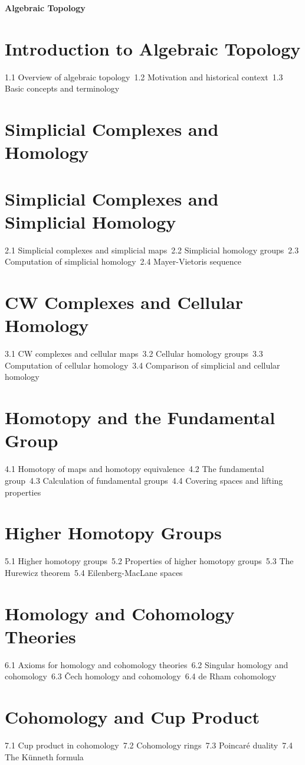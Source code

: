 {\LARGE \bf{Algebraic Topology}}
\section{Introduction to Algebraic Topology}
1.1 Overview of algebraic topology\
1.2 Motivation and historical context\
1.3 Basic concepts and terminology\
\section{Simplicial Complexes and Homology}
\section{Simplicial Complexes and Simplicial Homology}
2.1 Simplicial complexes and simplicial maps\
2.2 Simplicial homology groups\
2.3 Computation of simplicial homology\
2.4 Mayer-Vietoris sequence\
\section{CW Complexes and Cellular Homology}
3.1 CW complexes and cellular maps\
3.2 Cellular homology groups\
3.3 Computation of cellular homology\
3.4 Comparison of simplicial and cellular homology\
\section{Homotopy and the Fundamental Group}
4.1 Homotopy of maps and homotopy equivalence\
4.2 The fundamental group\
4.3 Calculation of fundamental groups\
4.4 Covering spaces and lifting properties\
\section{Higher Homotopy Groups}
5.1 Higher homotopy groups\
5.2 Properties of higher homotopy groups\
5.3 The Hurewicz theorem\
5.4 Eilenberg-MacLane spaces\
\section{Homology and Cohomology Theories}
6.1 Axioms for homology and cohomology theories\
6.2 Singular homology and cohomology\
6.3 Čech homology and cohomology\
6.4 de Rham cohomology\
\section{Cohomology and Cup Product}
7.1 Cup product in cohomology\
7.2 Cohomology rings\
7.3 Poincaré duality\
7.4 The Künneth formula\
